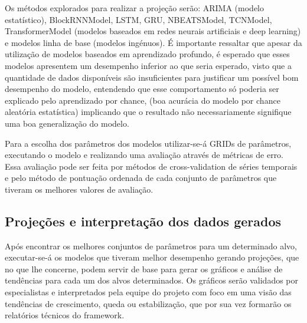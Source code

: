 Os métodos explorados para realizar a projeção serão: ARIMA (modelo estatístico), BlockRNNModel, LSTM, GRU, NBEATSModel, TCNModel,
TransformerModel (modelos baseados em redes neurais artificiais e deep learning) e modelos linha de base (modelos ingénuos). É importante ressaltar que apesar da utilização de modelos baseados em aprendizado profundo, é esperado que esses modelos apresentem um desempenho inferior ao que seria esperado, visto que a quantidade de dados disponíveis são insuficientes para justificar um possível bom desempenho do modelo, entendendo que esse comportamento só poderia ser explicado pelo aprendizado por chance, (boa acurácia do modelo por chance aleatória estatística) implicando que o resultado não necessariamente signifique uma boa generalização do modelo. 

Para a escolha dos parâmetros dos modelos utilizar-se-á GRIDs de parâmetros, executando o modelo e realizando uma avaliação através de métricas de erro. Essa avaliação pode ser feita por métodos de cross-validation de séries temporais e pelo método de pontuação ordenada de cada conjunto de
parâmetros que tiveram os melhores valores de avaliação.

\subsection{Projeções e interpretação dos dados gerados}
Após encontrar os melhores conjuntos de parâmetros para um determinado alvo, executar-se-á os modelos que tiveram melhor desempenho gerando
projeções, que no que lhe concerne, podem servir de base para gerar os gráficos e análise de tendências para cada um dos alvos determinados.
Os gráficos serão validados por especialistas e interpretados pela equipe do projeto com foco em uma visão das tendências de crescimento, queda ou
estabilização, que por sua vez formarão os relatórios técnicos do framework.
